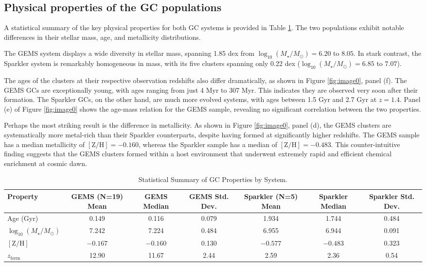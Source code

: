 \documentclass[]{article}
\begin{document}
\subsection{Physical properties of the GC populations}

A statistical summary of the key physical properties for both GC systems is provided in Table \ref{tab:summary_stats}. The two populations exhibit notable differences in their stellar mass, age, and metallicity distributions.

The GEMS system displays a wide diversity in stellar mass, spanning 1.85 dex from $\log_{10}(M_\star/M_\odot) = 6.20$ to $8.05$. In stark contrast, the Sparkler system is remarkably homogeneous in mass, with its five clusters spanning only 0.22 dex ($\log_{10}(M_\star/M_\odot) = 6.85$ to $7.07$).

The ages of the clusters at their respective observation redshifts also differ dramatically, as shown in Figure \ref{fig:image0}, panel (f). The GEMS GCs are exceptionally young, with ages ranging from just 4 Myr to 307 Myr. This indicates they are observed very soon after their formation. The Sparkler GCs, on the other hand, are much more evolved systems, with ages between 1.5 Gyr and 2.7 Gyr at $z=1.4$. Panel (e) of Figure \ref{fig:image0} shows the age-mass relation for the GEMS sample, revealing no significant correlation between the two properties.

Perhaps the most striking result is the difference in metallicity. As shown in Figure \ref{fig:image0}, panel (d), the GEMS clusters are systematically more metal-rich than their Sparkler counterparts, despite having formed at significantly higher redshifts. The GEMS sample has a median metallicity of $[\mathrm{Z/H}] = -0.160$, whereas the Sparkler sample has a median of $[\mathrm{Z/H}] = -0.483$. This counter-intuitive finding suggests that the GEMS clusters formed within a host environment that underwent extremely rapid and efficient chemical enrichment at cosmic dawn.

\begin{table}[t]
\centering
\caption{Statistical Summary of GC Properties by System.}
\label{tab:summary_stats}
\begin{tabular}{lcccccc}
\hline
\hline
Property & GEMS (N=19) Mean & GEMS Median & GEMS Std. Dev. & Sparkler (N=5) Mean & Sparkler Median & Sparkler Std. Dev. \\
\hline
Age (Gyr) & 0.149 & 0.116 & 0.079 & 1.934 & 1.744 & 0.484 \\
$\log_{10}(M_\star/M_\odot)$ & 7.242 & 7.224 & 0.484 & 6.955 & 6.944 & 0.091 \\
$[\mathrm{Z/H}]$ & $-0.167$ & $-0.160$ & 0.130 & $-0.577$ & $-0.483$ & 0.323 \\
$z_\mathrm{form}$ & 12.90 & 11.67 & 2.44 & 2.59 & 2.36 & 0.54 \\
\hline
\end{tabular}
\end{table}
\end{document}

